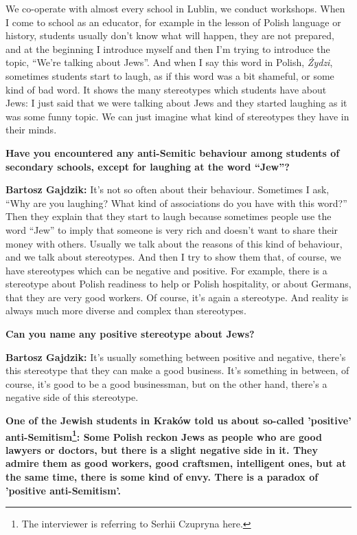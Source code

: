 We co-operate with almost every school in Lublin, we conduct workshops. When I come to school as an educator, for example in the lesson of Polish language or history, students usually don’t know what will happen, they are not prepared, and at the beginning I introduce myself and then I’m trying to introduce the topic, ``We’re talking about Jews''. And when I say this word in Polish, \textit{Żydzi}, sometimes students start to laugh, as if this word was a bit shameful, or some kind of bad word. It shows the many stereotypes which students have about Jews: I just said that we were talking about Jews and they started laughing as it was some funny topic. We can just imagine what kind of stereotypes they have in their minds. 

\textbf{Have you encountered any anti-Semitic behaviour among students of secondary schools, except for laughing at the word ``Jew''?} 

\textbf{Bartosz Gajdzik:} It’s not so often about their behaviour. Sometimes I ask, ``Why are you laughing? What kind of associations do you have with this word?'' Then they explain that they start to laugh because sometimes people use the word ``Jew'' to imply that someone is very rich and doesn’t want to share their money with others. Usually we talk about the reasons of this kind of behaviour, and we talk about stereotypes. And then I try to show them that, of course, we have stereotypes which can be negative and positive. For example, there is a stereotype about Polish readiness to help or Polish hospitality, or about Germans, that they are very good workers. Of course, it’s again a stereotype. And reality is always much more diverse and complex than stereotypes. 

\textbf{Can you name any positive stereotype about Jews?} 

\textbf{Bartosz Gajdzik:} It’s usually something between positive and negative, there’s this stereotype that they can make a good business. It’s something in between, of course, it’s good to be a good businessman, but on the other hand, there’s a negative side of this stereotype.

\textbf{One of the Jewish students in Kraków told us about so-called 'positive' anti-Semitism\footnote{The interviewer is referring to Serhii Czupryna here.}: Some Polish reckon Jews as people who are good lawyers or doctors, but there is a slight negative side in it. They admire them as good workers, good craftsmen, intelligent ones, but at the same time, there is some kind of envy. There is a paradox of 'positive anti-Semitism'.} 

